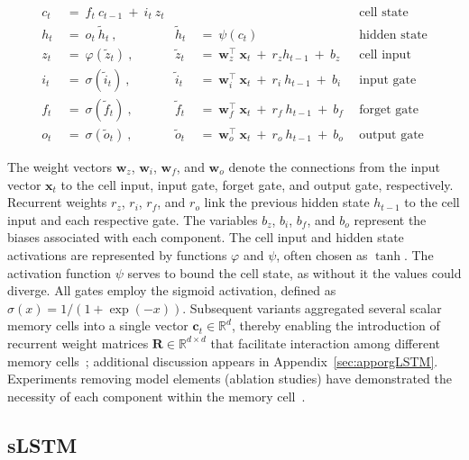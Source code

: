 \begin{align}
c_t \ &= \  f_t \ c_{t-1} \ + \ i_t \ z_t &  & &\text{cell state} \\
h_t  \ &= \ o_t \ \tilde{h}_t \ , & \tilde{h}_t \ &= \ \psi \left( c_t\right)
  &\text{hidden state} \\
z_t \ &= \ \varphi \left( \tilde{z}_t \right) \ , 
  &\tilde{z}_t \ &=  \ \mathbf{w}^\top_{z} \ \mathbf{x}_t \ + \
  r_{z}  h_{t-1} \ + \  b_{z} \ \
  &\text{cell input} \\
i_t \ &= \ \sigma \left( \tilde{i}_t  \right) \ , 
  &\tilde{i}_t \ &= \ \mathbf{w}^\top_{i} \ \mathbf{x}_t \ + \
  r_{i}  \ h_{t-1} \ + \  b_{i} \ \
  &\text{input gate} \\
f_t \ &= \ \sigma \left(  \tilde{f}_t \right) \ , 
  &\tilde{f}_t \ &= \ \mathbf{w}^\top_{f} \ \mathbf{x}_t  \ + \
  r_{f}  \ h_{t-1} \ + \  b_{f} \ \
  &\text{forget gate} \\
o_t \ &= \ \sigma \left( \tilde{o}_t \right) \ , 
  &\tilde{o}_t  \ &= \ \mathbf{w}^\top_{o} \ \mathbf{x}_t \ + \
  r_{o}  \ h_{t-1} \ + \  b_{o} \ \
  &\text{output gate} 
\end{align}

The weight vectors $\mathbf{w}_{z}$, $\mathbf{w}_{i}$, $\mathbf{w}_{f}$, and $\mathbf{w}_{o}$ denote the connections from the input vector $\mathbf{x}_t$ to the cell input, input gate, forget gate, and output gate, respectively. Recurrent weights $r_{z}$, $r_{i}$, $r_{f}$, and $r_{o}$ link the previous hidden state $h_{t-1}$ to the cell input and each respective gate. The variables $b_{z}$, $b_{i}$, $b_{f}$, and $b_{o}$ represent the biases associated with each component. The cell input and hidden state activations are represented by functions $\varphi$ and $\psi$, often chosen as $\tanh$. The activation function $\psi$ serves to bound the cell state, as without it the values could diverge. All gates employ the sigmoid activation, defined as $\sigma \left( x \right) = 1/(1+\exp(-x))$. Subsequent variants aggregated several scalar memory cells into a single vector $\mathbf{c}_t \in \mathbb{R}^{d}$, thereby enabling the introduction of recurrent weight matrices $\mathbf{R} \in \mathbb{R}^{d \times d}$ that facilitate interaction among different memory cells~\citep{Greff:15}; additional discussion appears in Appendix~\ref{sec:apporgLSTM}. Experiments removing model elements (ablation studies) have demonstrated the necessity of each component within the memory cell~\citep{Greff:15}.

\subsection{sLSTM}
\label{sec:sLSTM}

